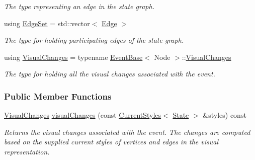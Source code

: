 \begin{DoxyCompactItemize}
\begin{DoxyCompactList}\small\item\em The type representing an edge in the state graph. \end{DoxyCompactList}\item 
using \hyperlink{structevent_1_1UniformChange_a01841b7c7ff05760a96c8b239f82a29c}{Edge\+Set} = std\+::vector$<$ \hyperlink{structevent_1_1UniformChange_a74eab4759202393dcf9438a25bd9261e}{Edge} $>$\hypertarget{structevent_1_1UniformChange_a01841b7c7ff05760a96c8b239f82a29c}{}\label{structevent_1_1UniformChange_a01841b7c7ff05760a96c8b239f82a29c}

\begin{DoxyCompactList}\small\item\em The type for holding participating edges of the state graph. \end{DoxyCompactList}\item 
using \hyperlink{structevent_1_1UniformChange_a6039f813fbef8495b804a903457baad4}{Visual\+Changes} = typename \hyperlink{structEventBase}{Event\+Base}$<$ Node $>$\+::\hyperlink{structevent_1_1UniformChange_a6039f813fbef8495b804a903457baad4}{Visual\+Changes}\hypertarget{structevent_1_1UniformChange_a6039f813fbef8495b804a903457baad4}{}\label{structevent_1_1UniformChange_a6039f813fbef8495b804a903457baad4}

\begin{DoxyCompactList}\small\item\em The type for holding all the visual changes associated with the event. \end{DoxyCompactList}\end{DoxyCompactItemize}
\subsubsection*{Public Member Functions}
\begin{DoxyCompactItemize}
\item 
\hyperlink{structevent_1_1UniformChange_a6039f813fbef8495b804a903457baad4}{Visual\+Changes} \hyperlink{structevent_1_1UniformChange_a713ac604c61e1c9472fba0d6c6f4c333}{visual\+Changes} (const \hyperlink{structCurrentStyles}{Current\+Styles}$<$ \hyperlink{structevent_1_1UniformChange_ab1e7d4054a2132fdb3b58295145f78cd}{State} $>$ \&styles) const 
\begin{DoxyCompactList}\small\item\em Returns the visual changes associated with the event. The changes are computed based on the supplied current styles of vertices and edges in the visual representation. \end{DoxyCompactList}\end{DoxyCompactItemize}
